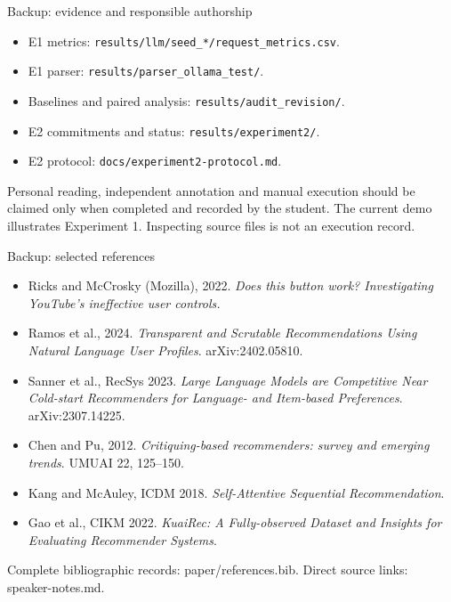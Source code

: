 \documentclass[10pt]{beamer}
\newcommand{\src}[1]{\vfill{\tiny\color{bcitgray}#1}}
\begin{document}
\begin{frame}{Backup: evidence and responsible authorship}
\small
\begin{itemize}
\item E1 metrics: \texttt{results/llm/seed\_*/request\_metrics.csv}.
\item E1 parser: \texttt{results/parser\_ollama\_test/}.
\item Baselines and paired analysis: \texttt{results/audit\_revision/}.
\item E2 commitments and status: \texttt{results/experiment2/}.
\item E2 protocol: \texttt{docs/experiment2-protocol.md}.
\end{itemize}
\vspace{0.3cm}
Personal reading, independent annotation and manual execution should be claimed only when completed and recorded by the student.
\src{The current demo illustrates Experiment 1. Inspecting source files is not an execution record.}
\end{frame}

\begin{frame}{Backup: selected references}
\footnotesize
\begin{itemize}
\item Ricks and McCrosky (Mozilla), 2022. \emph{Does this button work? Investigating YouTube's ineffective user controls.}
\item Ramos et al., 2024. \emph{Transparent and Scrutable Recommendations Using Natural Language User Profiles}. arXiv:2402.05810.
\item Sanner et al., RecSys 2023. \emph{Large Language Models are Competitive Near Cold-start Recommenders for Language- and Item-based Preferences}. arXiv:2307.14225.
\item Chen and Pu, 2012. \emph{Critiquing-based recommenders: survey and emerging trends}. UMUAI 22, 125--150.
\item Kang and McAuley, ICDM 2018. \emph{Self-Attentive Sequential Recommendation}.
\item Gao et al., CIKM 2022. \emph{KuaiRec: A Fully-observed Dataset and Insights for Evaluating Recommender Systems}.
\end{itemize}
\src{Complete bibliographic records: paper/references.bib. Direct source links: speaker-notes.md.}
\end{frame}
\end{document}
